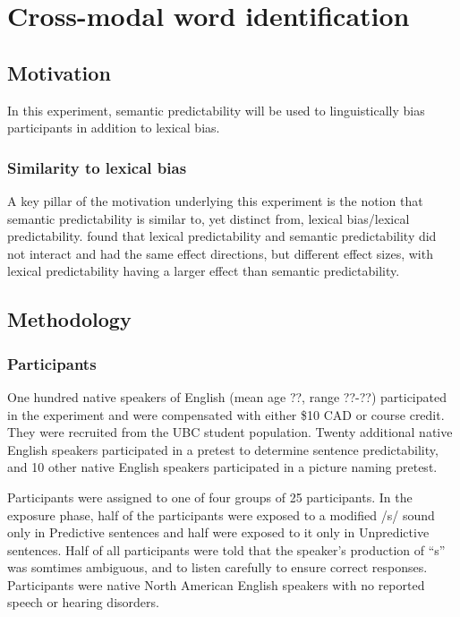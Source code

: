 
\chapter{Cross-modal word identification}


\section{Motivation}

In this experiment, semantic predictability will be used to linguistically bias participants in addition to lexical bias.  

\subsection{Similarity to lexical bias}

A key pillar of the motivation underlying this experiment is the notion that semantic predictability is similar to, yet distinct from, lexical bias/lexical predictability.  
\citet{Scarborough2010} found that lexical predictability and semantic predictability did not interact and had the same effect directions, but different effect sizes, with lexical predictability having a larger effect than semantic predictability.

\section{Methodology}

\subsection{Participants}

One hundred native speakers of English (mean age ??, range ??-??) participated in the experiment and were compensated with either \$10 CAD or course credit. They were recruited from the UBC student population.  Twenty additional native English speakers participated in a pretest to determine sentence predictability, and 10 other native English speakers participated in a picture naming pretest.

Participants were assigned to one of four groups of 25 participants.  In the exposure phase, half of the participants were exposed to a modified /s/ sound only in Predictive sentences and half were exposed to it only in Unpredictive sentences.  Half of all participants were told that the speaker's production of ``s'' was somtimes ambiguous, and to listen carefully to ensure correct responses.  Participants were native North American English speakers with no reported speech or hearing disorders.


